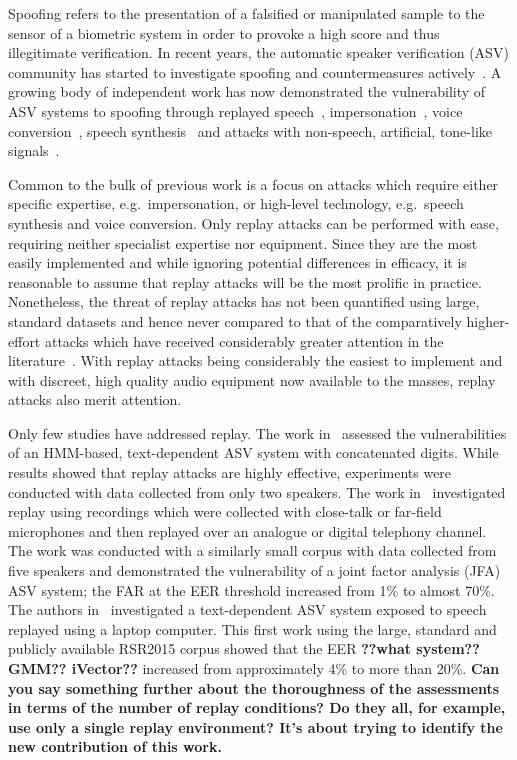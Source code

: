 
Spoofing refers to the presentation of a falsified or manipulated sample 
to the sensor of a biometric system in order to provoke a high score and 
thus illegitimate verification.
In recent years, the automatic speaker verification (ASV) community has 
started to investigate spoofing and countermeasures 
actively~\cite{interspeechSpecialSession, Wu2014a}. 
A growing 
body of independent work has now demonstrated the vulnerability of ASV 
systems to spoofing through 
replayed speech~\cite{Lindberg1999,Villalba2010},
impersonation~\cite{Blomberg2004,Farrus2008}, voice 
conversion~\cite{Perrot2005, Pellom1999}, speech 
synthesis~\cite{Masuko1999, Leon2010} and attacks with non-speech, 
artificial, tone-like signals~\cite{Alegre2012b}.

Common to the bulk of previous work is a focus on attacks 
which require either specific expertise, e.g.~impersonation, or high-level 
technology, e.g.~speech synthesis and voice conversion. 
Only replay attacks can be performed with ease, requiring neither specialist 
expertise nor equipment.  Since they are the most easily 
implemented and while ignoring potential differences in efficacy, 
it is reasonable to assume that replay attacks will be the most prolific
in practice.  Nonetheless, the threat of 
replay attacks has not been quantified using large, standard 
datasets and hence never compared to that of the comparatively higher-effort
attacks which have received considerably greater attention in the
literature~\cite{Wu2014a,handbookChapter}.
With replay attacks being considerably the easiest to implement
and with discreet, high quality audio equipment now available to the masses,
replay attacks also merit attention.

Only few studies have addressed replay.  
The work in~\cite{Lindberg1999} assessed the vulnerabilities of an HMM-based, text-dependent ASV system with concatenated digits.  
While results showed that replay attacks are highly effective, experiments were conducted with data collected from only two speakers.
The work in~\cite{Villalba2010} investigated replay using recordings which were collected with close-talk or far-field microphones and then replayed over an analogue or digital telephony channel. 
The work was conducted with a similarly small corpus with data collected from five speakers and demonstrated the vulnerability of a joint factor analysis (JFA) ASV system; the FAR at the EER threshold increased from 1\% to almost 70\%. 
The authors in~\cite{Wu2014} investigated a text-dependent 
ASV system exposed to speech replayed using a laptop computer. 
This first work using the large, standard and publicly available RSR2015 corpus showed that the EER {\bfseries ??what system?? GMM?? iVector??} increased from approximately 4\% to more than 20\%.
{\bfseries Can you say something further about the thoroughness of the assessments in terms of the number of replay conditions?  Do they all, for example, use only a single replay environment?  It's about trying to identify the new contribution of this work.}

